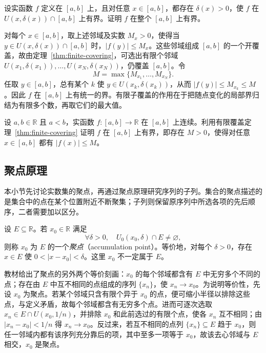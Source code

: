 \documentclass[UTF8,12pt,a4paper,fontset=fandol]{ctexbook}
\begin{document}
\begin{example}
设实函数 $f$ 定义在 $[a,b]$ 上，且对任意 $x\in[a,b]$，都存在 $\delta(x)>0$，使 $f$ 在 $U(x,\delta(x))\cap[a,b]$ 上有界。证明 $f$ 在整个 $[a,b]$ 上有界。
\end{example}

\begin{solve}
对每个 $x\in[a,b]$，取上述邻域及实数 $M_x>0$，使得当 $y\in U(x,\delta(x))\cap[a,b]$ 时，$|f(y)|\leq M_x$。这些邻域组成 $[a,b]$ 的一个开覆盖，故由定理~\ref{thm:finite-covering}，可选出有限个邻域 $U(x_1,\delta(x_1)),\ldots,U(x_N,\delta(x_N))$，仍覆盖 $[a,b]$。令
\[
    M=\max\{M_{x_1},\ldots,M_{x_N}\}.
\]
任取 $y\in[a,b]$，总有某个 $k$ 使 $y\in U(x_k,\delta(x_k))$，从而 $|f(y)|\leq M_{x_k}\leq M$。因此 $f$ 在 $[a,b]$ 上有统一的界。有限子覆盖的作用在于把随点变化的局部界归结为有限多个数，再取它们的最大值。
\end{solve}

\begin{example}
\label{ex:continuous-function-bounded-by-finite-cover}
设 $a,b\in\mathbb{R}$ 且 $a<b$，实函数 $f:[a,b]\to\mathbb{R}$ 在 $[a,b]$ 上连续。利用有限覆盖定理~\ref{thm:finite-covering} 证明 $f$ 在 $[a,b]$ 上有界，即存在 $M>0$，使得对任意 $x\in[a,b]$ 都有 $|f(x)|\leq M$。
\end{example}

\subsection{聚点原理}
\label{subsec:accumulation-point-principle}

本小节先讨论实数集的聚点，再通过聚点原理研究序列的子列。集合的聚点描述的是集合中的点在某个位置附近不断聚集；子列则保留原序列中所选各项的先后顺序，二者需要加以区分。

\begin{definition}
\label{def:accumulation-point-of-real-set}
设 $E\subseteq\mathbb{R}$。若 $x_0\in\mathbb{R}$ 满足
\[
    \forall\delta>0,\quad U_0(x_0,\delta)\cap E\neq\varnothing,
\]
则称 $x_0$ 为 $E$ 的一个\emph{聚点}（accumulation point）。等价地，对每个 $\delta>0$，存在 $x\in E$ 使 $0<|x-x_0|<\delta$。这里 $x_0$ 不一定属于 $E$。
\end{definition}

教材给出了聚点的另外两个等价刻画：$x_0$ 的每个邻域都含有 $E$ 中无穷多个不同的点；存在由 $E$ 中互不相同的点组成的序列 $\{x_n\}$，使 $x_n\to x_0$。为说明等价性，先设 $x_0$ 为聚点。若某个邻域只含有限个异于 $x_0$ 的点，便可缩小半径以排除这些点，与定义矛盾，故每个邻域都含有无穷多个点。进而可逐次选取 $x_n\in E\cap U(x_0,1/n)$，并排除 $x_0$ 和此前选过的有限个点，使各 $x_n$ 互不相同；由 $|x_n-x_0|<1/n$ 得 $x_n\to x_0$。反过来，若互不相同的点列 $\{x_n\}\subseteq E$ 趋于 $x_0$，则任一邻域内都有该序列充分靠后的项，其中至多一项等于 $x_0$，故该去心邻域与 $E$ 相交，$x_0$ 是聚点。
\end{document}

